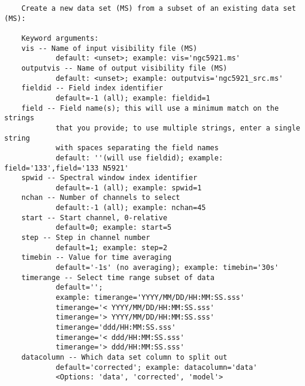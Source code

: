 \vspace{3mm}
\small
\begin{verbatim}
    Create a new data set (MS) from a subset of an existing data set (MS):
    
    Keyword arguments:
    vis -- Name of input visibility file (MS)
            default: <unset>; example: vis='ngc5921.ms'
    outputvis -- Name of output visibility file (MS)
            default: <unset>; example: outputvis='ngc5921_src.ms'
    fieldid -- Field index identifier
            default=-1 (all); example: fieldid=1
    field -- Field name(s); this will use a minimum match on the strings
            that you provide; to use multiple strings, enter a single string
            with spaces separating the field names
            default: ''(will use fieldid); example: field='133',field='133 N5921'
    spwid -- Spectral window index identifier
            default=-1 (all); example: spwid=1
    nchan -- Number of channels to select
            default:-1 (all); example: nchan=45
    start -- Start channel, 0-relative
            default=0; example: start=5
    step -- Step in channel number
            default=1; example: step=2      
    timebin -- Value for time averaging
            default='-1s' (no averaging); example: timebin='30s'
    timerange -- Select time range subset of data
            default=''; 
            example: timerange='YYYY/MM/DD/HH:MM:SS.sss'
            timerange='< YYYY/MM/DD/HH:MM:SS.sss'
            timerange='> YYYY/MM/DD/HH:MM:SS.sss'
            timerange='ddd/HH:MM:SS.sss'
            timerange='< ddd/HH:MM:SS.sss'
            timerange='> ddd/HH:MM:SS.sss'
    datacolumn -- Which data set column to split out
            default='corrected'; example: datacolumn='data'
            <Options: 'data', 'corrected', 'model'>
\end{verbatim}
\normalsize

